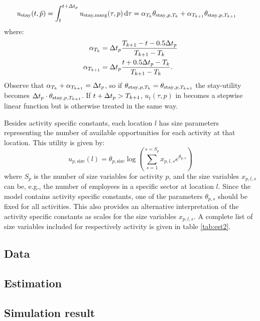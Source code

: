 \begin{equation} \label{eq:uacttime}
\begin{aligned}
\ustay(t,\act{p}) &= \int_t^{t+\dura{p}} u_\text{stay,marg}(\tau,p) %
\ud{\tau} = \alpha_{T_k}\theta_{\stay,p,T_k} + \alpha_{T_{k+1}}\theta_{\stay,p,T_{k+1}}%
\end{aligned}
\end{equation}
where:
\begin{align*}
\alpha_{T_k}&=\dura{p}\frac{T_{k+1} - t - 0.5 \dura{p}}{T_{k+1}-T_{k}}\\
\alpha_{T_{k+1}}&=\dura{p}\frac{t + 0.5\dura{p} - T_k}{T_{k+1}-T_{k}}.
\end{align*}
Observe that  $\alpha_{T_k} + \alpha_{T_{k+1}} = \Delta t_p$, so if $\theta_{\text{stay},p,T_k} = \theta_{\text{stay},p,T_{k+1}}$ the stay-utility becomes $\Delta t_p \cdot \theta_{\text{stay},p,T_{k+1}}$.
If $t+\Delta t_p> T_{k+1}$, $u_t(\tau,p)$ in  becomes a stepwise linear function but is otherwise treated in the same way.

Besides activity specific constants, each location $l$ has size parameters representing the number of available opportunities for each activity at that location. This utility is given by:
\begin{equation*}
u_{p,\text{size}}(l) =\theta_{p,\text{size}}\log \left( \sum_{s=1}^{s=S_p} x_{p,l,s}e^{\theta_{p,s}} \right)
\end{equation*}
where $S_p$ is the number of size variables for activity $p$, and the size variables $x_{p,l,s}$ can be, e.g., the number of employees in a specific sector at location $l$. Since the model contains activity specific constants, one of the parameters $\theta_{p,s}$ should be fixed for all activities. This also provides an alternative interpretation of the activity specific constants as scales for the size variables $x_{p,l,s}$. A complete list of size variables included for respectively activity is given in table \ref{tab:est2}. 

\subsection{Data}


\subsection{Estimation}



\subsection{Simulation result}



